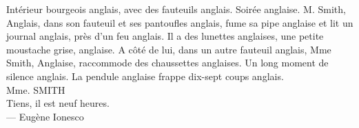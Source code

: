 \cleardoublepage
\thispagestyle{empty}


\vspace*{3cm}

\noindent\hfill\begin{minipage}{10cm} 
    Intérieur bourgeois anglais, avec des
fauteuils anglais. Soirée anglaise. M. Smith,
Anglais, dans son fauteuil et ses pantoufles
anglais, fume sa pipe anglaise et lit un
journal anglais, près d'un feu anglais. Il a
des lunettes anglaises, une petite
moustache grise, anglaise. A côté de lui,
dans un autre fauteuil anglais, Mme Smith,
Anglaise, raccommode des chaussettes
anglaises. Un long moment de silence
anglais. La pendule anglaise frappe dix-sept coups anglais.\\[6pt]
Mme. SMITH\\[6pt]
Tiens, il est neuf heures.\\[16pt]
     --- Eugène Ionesco
\end{minipage}


